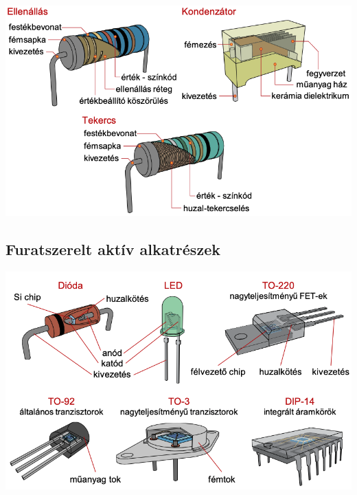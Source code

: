 \documentclass[11pt]{article}
\begin{document}
			\begin{center}\includegraphics[width=.95\textwidth]{images/2.5/1.png}\end{center}

		\subsection{Furatszerelt aktív alkatrészek}

			\begin{center}\includegraphics[width=.95\textwidth]{images/2.6/1.png}\end{center}
\end{document}
